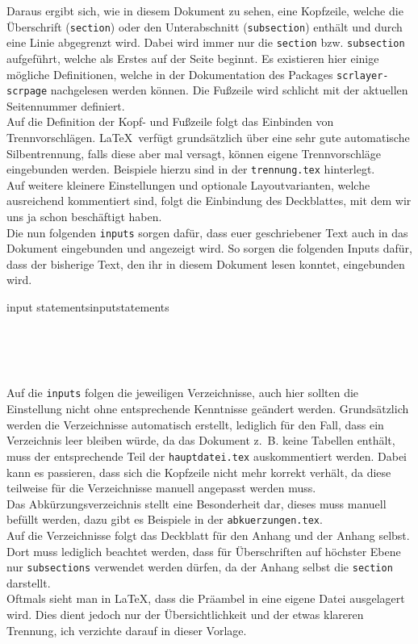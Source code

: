 Daraus ergibt sich, wie in diesem Dokument zu sehen, eine Kopfzeile, welche die
Überschrift (\texttt{section}) oder den Unterabschnitt (\texttt{subsection})
enthält und durch eine Linie abgegrenzt wird. Dabei wird immer nur die
\texttt{section} bzw. \texttt{subsection} aufgeführt, welche als Erstes auf der
Seite beginnt. Es existieren hier einige mögliche Definitionen, welche 
in der Dokumentation des Packages \texttt{scrlayer-scrpage} nachgelesen werden 
können. Die Fußzeile wird schlicht mit der aktuellen Seitennummer definiert.\\
Auf die Definition der Kopf- und Fußzeile folgt das Einbinden von
Trennvorschlägen. \LaTeX~verfügt grundsätzlich über eine sehr gute automatische
Silbentrennung, falls diese aber mal versagt, können eigene Trennvorschläge
eingebunden werden. Beispiele hierzu sind in der \texttt{trennung.tex}
hinterlegt.\\ Auf weitere kleinere Einstellungen und optionale Layoutvarianten,
welche ausreichend kommentiert sind, folgt die Einbindung des Deckblattes, mit
dem wir uns ja schon beschäftigt haben.\\ Die nun folgenden \texttt{inputs}
sorgen dafür, dass euer geschriebener Text auch in das Dokument eingebunden und
angezeigt wird. So sorgen die folgenden Inputs dafür, dass der bisherige Text,
den ihr in diesem Dokument lesen konntet, eingebunden wird.

\vspace*{-1.0cm}
\begin{code}{input statements}{inputstatements}
	\begin{verbatim}
	
	
	
	\end{verbatim}
\end{code}

Auf die \texttt{inputs} folgen die jeweiligen Verzeichnisse, auch hier sollten 
die Einstellung nicht ohne entsprechende Kenntnisse geändert werden. Grundsätzlich
werden die Verzeichnisse automatisch erstellt, lediglich für den Fall, dass ein
Verzeichnis leer bleiben würde, da das Dokument z. B. keine Tabellen enthält,
muss der entsprechende Teil der \texttt{hauptdatei.tex} auskommentiert werden.
Dabei kann es passieren, dass sich die Kopfzeile nicht mehr korrekt verhält, da
diese teilweise für die Verzeichnisse manuell angepasst werden muss.\\ Das
Abkürzungsverzeichnis stellt eine Besonderheit dar, dieses muss manuell befüllt
werden, dazu gibt es Beispiele in der \texttt{abkuerzungen.tex}.\\ Auf die
Verzeichnisse folgt das Deckblatt für den Anhang und der Anhang selbst. Dort
muss lediglich beachtet werden, dass für Überschriften auf höchster Ebene nur
\texttt{subsections} verwendet werden dürfen, da der Anhang selbst die
\texttt{section} darstellt.\\ Oftmals sieht man in \LaTeX, dass die Präambel in
eine eigene Datei ausgelagert wird. Dies dient jedoch nur der Übersichtlichkeit
und der etwas klareren Trennung, ich verzichte darauf in dieser Vorlage.